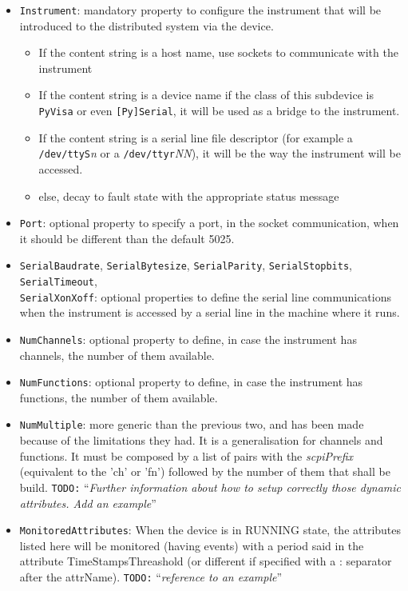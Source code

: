 \documentclass[a4paper,10pt]{article}
\newcommand{\todo}[1]{\texttt{\color{red}TODO:} ``\emph{#1}''}
\begin{document}
\begin{itemize}
    \item {\tt Instrument}: mandatory property to configure the instrument that will be introduced to the distributed system via the device.
    \begin{itemize}
        \item If the content string is a host name, use sockets to communicate with the instrument
        \item If the content string is a device name if the class of this subdevice is \texttt{PyVisa} or even \texttt{[Py]Serial}, it will be used as a bridge to the instrument.
        \item If the content string is a serial line file descriptor (for example a \texttt{/dev/ttyS}\emph{n} or a \texttt{/dev/ttyr}\emph{NN}), it will be the way the instrument will be accessed.
        \item else, decay to fault state with the appropriate status message
    \end{itemize}
    \item {\tt Port}: optional property to specify a port, in the socket communication, when it should be different than the default 5025.
    \item {\tt SerialBaudrate}, {\tt SerialBytesize}, {\tt SerialParity}, {\tt SerialStopbits}, {\tt SerialTimeout},\\ {\tt SerialXonXoff}: optional properties to define the serial line communications when the instrument is accessed by a serial line in the machine where it runs.
    \item {\tt NumChannels}: optional property to define, in case the instrument has channels, the number of them available.
    \item {\tt NumFunctions}: optional property to define, in case the instrument has functions, the number of them available.
    \item {\tt NumMultiple}: more generic than the previous two, and has been made because of the limitations they had. It is a generalisation for channels and functions. It must be composed by a list of pairs with the \emph{scpiPrefix} (equivalent to the 'ch' or 'fn') followed by the number of them that shall be build. \todo{Further information about how to setup correctly those dynamic attributes. Add an example}
    \item {\tt MonitoredAttributes}: When the device is in RUNNING state, the attributes listed here will be monitored (having events) with a period said in the attribute TimeStampsThreashold (or different if specified with a : separator after the attrName). \todo{reference to an example}

\end{itemize}
\end{document}
